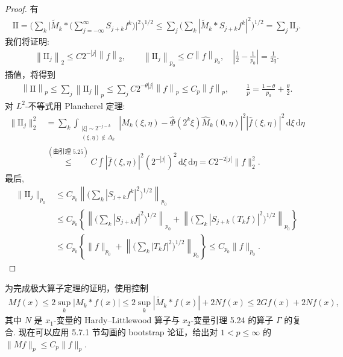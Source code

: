 \begin{proof}
有
\begin{align*}
  \mathrm{II}=\Big(\sum_{k}\Big|\widetilde{M}_{k}*\Big(\sum_{j=-\infty}^{\infty}S_{j+k}f^{k}\Big)\Big|^{2}\Big)^{1/2}
  \leq\sum_{j}\Big(\sum_{k}|\widetilde{M}_{k}*S_{j+k}f^{k}|^{2}\Big)^{1/2}
  =\sum_{j}\mathrm{II}_{j}.
\end{align*}
我们将证明:
\begin{align*}
  \left\|\mathrm{II}_{j}\right\|_{2}\leq C2^{-\left|j\right|}\left\|f\right\|_{2},
  \qquad
  \left\|\mathrm{II}_{j}\right\|_{p_{0}}\leq C\left\|f\right\|_{p_{0}},
  \quad \left|\frac{1}{2}-\frac{1}{p_{0}}\right|=\frac{1}{2q}.
\end{align*}
插值，将得到
\begin{align*}
  \left\|\mathrm{II}\right\|_{p}\leq\sum_{j}\left\|\mathrm{II}_{j}\right\|_{p}
  \leq\sum_{j}C2^{-\theta\left|j\right|}\left\|f\right\|_{p}
  \leq C_{p}\left\|f\right\|_{p},
  \qquad \frac{1}{p}=\frac{1-\theta}{p_{0}}+\frac{\theta}{2}.
\end{align*}
对 $L^{2}$-不等式用 Plancherel 定理:
\begin{align*}
  \|\mathrm{II}_{j}\|_{2}^{2}
  &=\sum_{k}\int_{\substack{|\xi|\sim 2^{-j-k}\\ (\xi,\eta)\notin\Delta_{k}}}
   |\widehat{M}_{k}(\xi,\eta)-\widehat{\Phi}(2^{k}\xi)\widehat{M}_{k}(0,\eta)|^{2}|\widehat{f}(\xi,\eta)|^{2}\,\mathrm{d}\xi\,\mathrm{d}\eta\\
  &\stackrel{(\text{由引理~5.25})}{\leq}C\int|\widehat{f}(\xi,\eta)|^{2}(2^{-|j|})^{2}\,\mathrm{d}\xi\,\mathrm{d}\eta
  =C2^{-2|j|}\|f\|_{2}^{2}.
\end{align*}
最后,
\begin{align*}
  \|\mathrm{II}_{j}\|_{p_{0}}
  &\leq C_{p_{0}}\left\|\Big(\sum_{k}|S_{j+k}f^{k}|^{2}\Big)^{1/2}\right\|_{p_{0}}\\
  &\leq C_{p_{0}}\left\{\left\|\Big(\sum_{k}|S_{j+k}f|^{2}\Big)^{1/2}\right\|_{p_{0}}
   +\left\|\Big(\sum_{k}|S_{j+k}(T_{k} f)|^{2}\Big)^{1/2}\right\|_{p_{0}}\right\}\\
  &\leq C_{p_{0}}\left\{\|f\|_{p_{0}}+\left\|\Big(\sum_{k}|T_{k} f|^{2}\Big)^{1/2}\right\|_{p_{0}}\right\}
  \leq C_{p_{0}}\|f\|_{p_{0}}.
\end{align*}
\end{proof}

为完成极大算子定理的证明，使用控制
\begin{align*}
  Mf(x)\leq 2\sup_{k}|M_{k}*f(x)|
  \leq 2\sup_{k}|\widetilde{M}_{k}*f(x)|+2Nf(x)
  \leq 2Gf(x)+2Nf(x),
\end{align*}
其中 $N$ 是 $x_1$-变量的 Hardy--Littlewood 算子与 $x_2$-变量引理 5.24 的算子 $\Gamma$ 的复合. 现在可以应用 5.7.1 节勾画的 bootstrap 论证，给出对 $1 < p \leq \infty$ 的 $\|M f\|_p \leq C_p \|f\|_p$.

